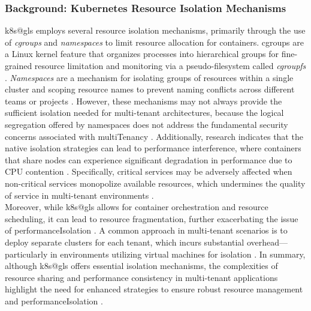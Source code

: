 \documentclass[11pt, a4paper, oneside, listof=totoc]{scrartcl}
\begin{document}
            \subsubsection{Background: Kubernetes Resource Isolation Mechanisms}\label{subsubsec:k8sResourceIsolation}
                \gls{k8s@gls} employs several resource isolation mechanisms, primarily through the
                use of \textit{\gls{cgroups}} and \textit{namespaces} to limit
                resource allocation for containers.
                \Gls{cgroups} are a Linux kernel feature that organizes processes into hierarchical
                groups for fine-grained resource limitation and monitoring via a pseudo-filesystem
                called \textit{cgroupfs} \parencites{kubernetesCgroupsV2}{cgroups7}.
                \textit{Namespaces} are a mechanism for isolating groups of resources within a
                single cluster and scoping resource names to prevent naming conflicts across
                different teams or projects \parencite{kubernetesNamespaces}.
                However, these mechanisms may not always provide the sufficient isolation needed for
                multi-tenant architectures, because the logical segregation offered by namespaces
                does not address the fundamental security concerns associated with
                \gls{multiTenancy} \parencite[p.~651]{nguyen2022}.
                Additionally, research indicates that the native isolation strategies can lead to
                performance interference, where containers that share nodes can experience
                significant degradation in performance due to CPU contention
                \parencite[p.~158]{kim2021}.
                Specifically, critical services may be adversely affected when non-critical services
                monopolize available resources, which undermines the quality of service in
                multi-tenant environments \parencite[p.~30410]{li2019}.
                \\
                Moreover, while \gls{k8s@gls} allows for \gls{container} orchestration and resource
                scheduling, it can lead to resource fragmentation, further exacerbating the issue
                of \gls{performanceIsolation} \parencite[p.~1]{jian2023}.
                A common approach in multi-tenant scenarios is to deploy separate clusters for each
                tenant, which incurs substantial overhead—particularly in environments utilizing
                virtual machines for isolation \parencite[pp.~144574--144575]{senel2023}.
                In summary, although \gls{k8s@gls} offers essential isolation mechanisms, the
                complexities of resource sharing and performance consistency in multi-tenant
                applications highlight the need for enhanced strategies to ensure robust resource
                management and \gls{performanceIsolation}
                \parencites[p.~651]{nguyen2022}[p.~2]{jian2023}[p.~158]{kim2021}.
\end{document}
